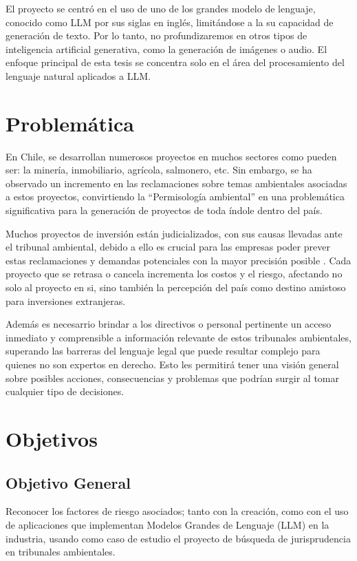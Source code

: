 El proyecto se centró en el uso de uno de los grandes modelo de lenguaje, conocido como LLM por sus siglas en inglés, limitándose a la su capacidad de 
generación de texto. Por lo tanto, no profundizaremos en otros tipos de inteligencia artificial generativa, como la 
generación de imágenes o audio. El enfoque principal de esta tesis se concentra solo en el área del procesamiento del lenguaje natural aplicados a LLM.

\newpage


\section{Problemática}

\par En Chile, se desarrollan numerosos proyectos en muchos sectores como pueden ser: la minería, inmobiliario, agrícola, salmonero, etc. Sin embargo, se ha observado un incremento en las reclamaciones 
sobre temas ambientales asociadas a estos proyectos, convirtiendo la ``Permisología ambiental'' en una problemática significativa para la generación de proyectos de toda índole dentro del país.

\par Muchos proyectos de inversión están judicializados, con sus causas llevadas ante el tribunal ambiental, debido a ello es crucial para las empresas poder prever estas reclamaciones y demandas 
potenciales con la mayor precisión posible \cite{p1}\cite{p2}\cite{p3}. Cada proyecto que se retrasa o cancela incrementa los costos y el riesgo, afectando no solo al proyecto en si, sino también la percepción del país como 
destino amistoso para inversiones extranjeras.

\par Además es necesarrio brindar a los directivos o personal pertinente un acceso inmediato y comprensible a información relevante de estos tribunales ambientales, superando las 
barreras del lenguaje legal que puede resultar complejo para quienes no son expertos en derecho. Esto les permitirá tener una visión general sobre posibles acciones, consecuencias y problemas que 
podrían surgir al tomar cualquier tipo de decisiones.

\section{Objetivos}
\subsection{Objetivo General}
Reconocer los factores de riesgo asociados; tanto con la creación, como con el uso de aplicaciones que implementan Modelos 
Grandes de Lenguaje (LLM) en la industria, usando como caso de estudio el proyecto de búsqueda de jurisprudencia en tribunales ambientales. 

